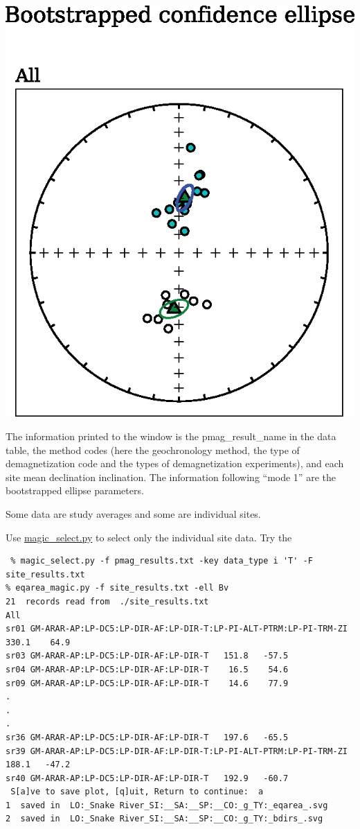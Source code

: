 \documentclass[11pt]{book}
\begin{document}
{{%
{%
 \includegraphics[width=12 cm]{EPSfiles/eqarea-magic.eps}}

The information printed to the window is the pmag\_result\_name in the data table, the method codes (here the geochronology method, the type of demagnetization code and the types of demagnetization experiments), and each site mean declination  inclination.    The information following ``mode 1'' are the bootstrapped ellipse parameters.

Some data are study averages and some are individual sites.

 Use \href{#magic_select.py}{magic\_select.py} to select only the individual site data.  Try the

 \begin{verbatim}
 % magic_select.py -f pmag_results.txt -key data_type i 'T' -F site_results.txt
% eqarea_magic.py -f site_results.txt -ell Bv
21  records read from  ./site_results.txt
All
sr01 GM-ARAR-AP:LP-DC5:LP-DIR-AF:LP-DIR-T:LP-PI-ALT-PTRM:LP-PI-TRM-ZI   330.1    64.9
sr03 GM-ARAR-AP:LP-DC5:LP-DIR-AF:LP-DIR-T   151.8   -57.5
sr04 GM-ARAR-AP:LP-DC5:LP-DIR-AF:LP-DIR-T    16.5    54.6
sr09 GM-ARAR-AP:LP-DC5:LP-DIR-AF:LP-DIR-T    14.6    77.9
.
.
.
sr36 GM-ARAR-AP:LP-DC5:LP-DIR-AF:LP-DIR-T   197.6   -65.5
sr39 GM-ARAR-AP:LP-DC5:LP-DIR-AF:LP-DIR-T:LP-PI-ALT-PTRM:LP-PI-TRM-ZI   188.1   -47.2
sr40 GM-ARAR-AP:LP-DC5:LP-DIR-AF:LP-DIR-T   192.9   -60.7
 S[a]ve to save plot, [q]uit, Return to continue:  a
1  saved in  LO:_Snake River_SI:__SA:__SP:__CO:_g_TY:_eqarea_.svg
2  saved in  LO:_Snake River_SI:__SA:__SP:__CO:_g_TY:_bdirs_.svg
\end{verbatim}

}}
\end{document}
